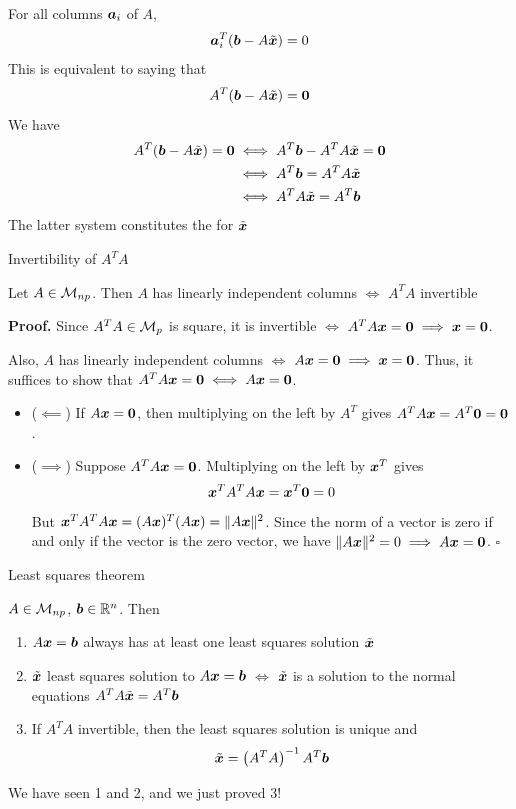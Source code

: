 \documentclass[aspectratio=169]{beamer}\usepackage[]{graphicx}\usepackage[]{xcolor}
\begin{document}
\begin{frame}
For all columns $\bm{a}_i$ of $A$,
\[\bm{a}_i^T(\bm{b}-A\tilde{\bm{x}}) = 0
\]
\vfill
This is equivalent to saying that
\[
A^T(\bb-A\tilde\bx) = \b0
\]
\vfill
We have
\begin{align*}
A^T(\bb-A\tilde\bx) = \b0 &\iff A^T\bb - A^TA\tilde\bx = \b0 \\
&\iff A^T\bb = A^TA\tilde\bx \\
&\iff A^TA\tilde\bx = A^T\bb
\end{align*}
The latter system constitutes the  for $\tilde{\bm{x}}$
\end{frame}


\begin{frame}{Invertibility of $A^TA$}
\begin{theorem}[Invertibility of $A^TA$]
Let $A \in \mathcal{M}_{np}$. Then $A$ has linearly independent columns $\iff$ $A^TA$ invertible
\end{theorem}
\vfill
\textbf{Proof.}
Since $A^TA \in \mathcal{M}_p$ is square, it is invertible $\iff$ $A^TA \bx = \b0 \implies \bx = \b0$.

Also, $A$ has linearly independent columns $\iff$ $A \bx = \b0 \implies \bx = \b0$. 
Thus, it suffices to show that $A^TA \bx = \b0 \iff A \bx = \b0$.

\begin{itemize}
\item ($\impliedby$) If $A\bx = \b0$, then multiplying on the left by $A^T$ gives $A^TA\bx = A^T\b0 = \b0$.
\item ($\implies$) Suppose $A^TA\bx = \b0$. Multiplying on the left by $\bm{x}^T$ gives
\[
\bx^T A^T A \bx = \bx^T \b0 = 0
\]
But $\bm{x}^T A^T A \bm{x} = (A\bm{x})^T (A\bm{x}) = \|A\bm{x}\|^2$. Since the norm of a vector is zero if and only if the vector is the zero vector, we have $\|A\bx\|^2 = 0 \implies A\bx = \b0$. \hfill $\square$
\end{itemize}
\end{frame}


\begin{frame}{Least squares theorem}
\begin{importanttheorem}\label{th:least_squares}
$A\in\mathcal{M}_{np}$, $\bm{b}\in\mathbb{R}^n$. Then
\begin{enumerate}
\item $A\bm{x}=\bm{b}$ always has at least one least squares solution $\tilde{\bm{x}}$
\item $\tilde{\bm{x}}$ least squares solution to $A\bm{x}=\bm{b}$ $\iff$ $\tilde{\bm{x}}$ is a solution to the normal equations $A^TA\tilde{\bm{x}} = A^T\bm{b}$
\item If $A^TA$ invertible, then the least squares solution is unique and 
\[
\tilde{\bm{x}} = \left(A^TA\right)^{-1}A^T\bm{b}
\]
\end{enumerate}
\end{importanttheorem}
\vfill
We have seen 1 and 2, and we just proved 3!
\end{frame}
\end{document}
